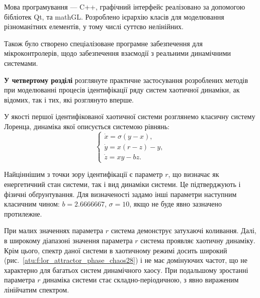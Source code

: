 \documentclass[a4paper,13pt]{atuaref}
\begin{document}
Мова програмування --- C++,
графічний інтерфейс реалізовано за допомогою
бібліотек Qt, та mathGL.
Розроблено ієрархію класів для
моделювання різноманітних елементів,
у тому числі суттєво нелінійних.

Також було створено спеціалізоване
програмне забезпечення для мікроконтролерів,
щодо забезпечення взаємодії
з реальними динамічними системами.


\textbf{У четвертому розділі}
розглянуте практичне застосування розроблених методів при моделюванні
процесів ідентифікації ряду систем хаотичної динаміки,
ак відомих, так і тих, які розглянуто вперше.

У якості першої ідентифікованої хаотичної системи розглянемо класичну систему
Лоренца, динаміка якої описується системою рівнянь:
%
\begin{equation}
\begin{cases}
  \dot{x} = \sigma (y-x ) , \\
  \dot{y} = x (r-z) - y , \\
  \dot{z} = x y - b z .
\end{cases}
\label{atu:eq:lor}
\end{equation}

Найціннішим з точки зору ідентифікації є параметр $ r $, що визначає як
енергетичний стан системи, так і вид динаміки системи. Це підтверджують і
фізичні обґрунтування. Для визначеності задамо інші параметри наступним
класичним чином: $ b = 2.6666667 $, $\sigma = 10 $, якщо не буде явно
зазначено протилежне.

При малих значеннях параметра $ r $ система демонструє затухаючі коливання.
Далі, в широкому діапазоні значення параметра $r$ система проявляє хаотичну
динаміку. Крім цього, спектр даної системи в хаотичному режимі досить широкий
(рис.~\ref{atu:f:lor_attractor_phase_chaos28}) і не має домінуючих
частот, що не характерно для багатьох систем динамічного хаосу.
При подальшому зростанні параметра $ r $ динаміка системи стає
складно-періодичною, з явно вираженим лінійчатим спектром.
\end{document}
